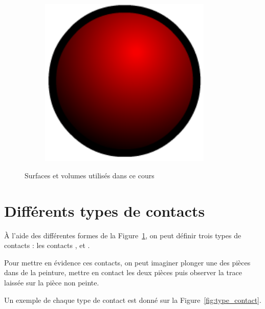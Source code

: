 \documentclass[10pt,fleqn]{article} %
\begin{document}
\begin{figure}[h]
\begin{subfigure}[b]{.3\textwidth}
    \caption{}
  \end{subfigure}\hfill
  \begin{subfigure}[b]{.3\textwidth}
    \centering
    \includegraphics[width=0.9\textwidth,height=.1\textheight,keepaspectratio]{images/sphere_rouge_seul}
    \caption{}
  \end{subfigure}\hfill
  \caption{Surfaces et volumes utilisés dans ce cours}
  \label{fig:volumes}
\end{figure}


\section{Différents types de contacts}
\begin{aretenir}
  À l'aide des différentes formes de la Figure~\ref{fig:volumes}, on peut définir trois types de contacts : les contacts ,  et .
\end{aretenir}

\begin{remark}
  Pour mettre en évidence ces contacts, on peut imaginer plonger une des pièces dans de la peinture, mettre en contact les deux pièces puis observer la trace laissée sur la pièce non peinte.
\end{remark}

Un exemple de chaque type de contact est donné sur la Figure~\ref{fig:type_contact}.
\end{document}
